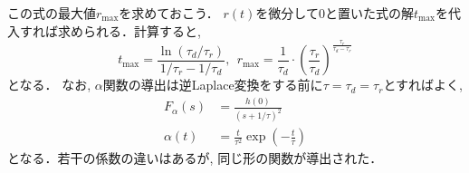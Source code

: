 この式の最大値$r_{\max}$を求めておこう． $r(t)$を微分して0と置いた式の解$t_{\max}$を代入すれば求められる．計算すると, 
$$
\begin{equation}
t_{\max}=\dfrac{\ln(\tau_d/\tau_r)}{1/\tau_r-1/\tau_d},\ \ r_{\max}=\dfrac{1}{\tau_{d}}\cdot \left(\dfrac{\tau_{r}}{\tau_{d}}\right)^{\frac{\tau_{r}}{\tau_d-\tau_{r}}}    
\end{equation}
$$
となる．
なお, $\alpha$関数の導出は逆Laplace変換をする前に$\tau=\tau_d=\tau_r$とすればよく, 
$$
\begin{align}
F_\alpha(s)&=\frac{h(0)}{(s+1/\tau)^2}\\
\alpha(t)&=\frac{t}{\tau^2}\exp\left(-\frac{t}{\tau}\right)
\end{align}
$$
となる．若干の係数の違いはあるが, 同じ形の関数が導出された． 
